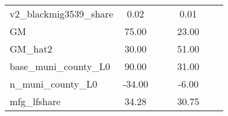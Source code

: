 \begin{table}[htbp]
\begin{tabular}{l*{2}{ccc}}
v2\_blackmig3539\_share&        0.02&            &            &        0.01&            &            \\
GM                  &       75.00&            &            &       23.00&            &            \\
GM\_hat2             &       30.00&            &            &       51.00&            &            \\
base\_muni\_county\_L0 &       90.00&            &            &       31.00&            &            \\
n\_muni\_county\_L0    &      -34.00&            &            &       -6.00&            &            \\
mfg\_lfshare         &       34.28&            &            &       30.75&            &            \\
\bottomrule
\end{tabular}
\end{table}

